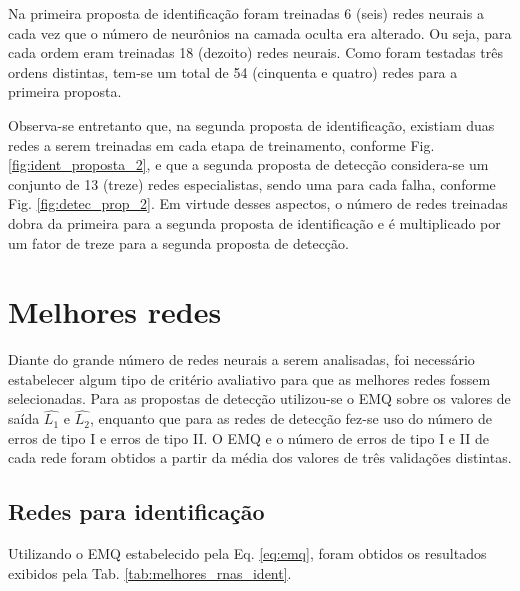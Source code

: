 Na primeira proposta de identificação foram treinadas 6 (seis) redes neurais a
cada vez que o número de neurônios na camada oculta era alterado. Ou seja, para
cada ordem eram treinadas 18 (dezoito) redes neurais. Como foram testadas três
ordens distintas, tem-se um total de 54 (cinquenta e quatro) redes para a
primeira proposta.

Observa-se entretanto que, na segunda proposta de identificação, existiam duas
redes a serem treinadas em cada etapa de treinamento, conforme Fig.
\ref{fig:ident_proposta_2}, e que a segunda proposta de detecção considera-se um
conjunto de 13 (treze) redes especialistas, sendo uma para cada falha, conforme
Fig. \ref{fig:detec_prop_2}. Em virtude desses aspectos, o número de redes
treinadas dobra da primeira para a segunda proposta de identificação e é
multiplicado por um fator de treze para a segunda proposta de detecção.

\section{Melhores redes}
Diante do grande número de redes neurais a serem analisadas, foi necessário
estabelecer algum tipo de critério avaliativo para que as melhores redes fossem
selecionadas. Para as propostas de detecção utilizou-se o EMQ sobre os valores
de saída $\widehat{L_1}$ e $\widehat{L_2}$, enquanto que para as redes de
detecção fez-se uso do número de erros de tipo I e erros de tipo II.  O EMQ e o
número de erros de tipo I e II de cada rede foram obtidos a partir da média dos
valores de três validações distintas.

\subsection{Redes para identificação}
Utilizando o EMQ estabelecido pela Eq. \ref{eq:emq}, foram obtidos os resultados
exibidos pela Tab. \ref{tab:melhores_rnas_ident}.

